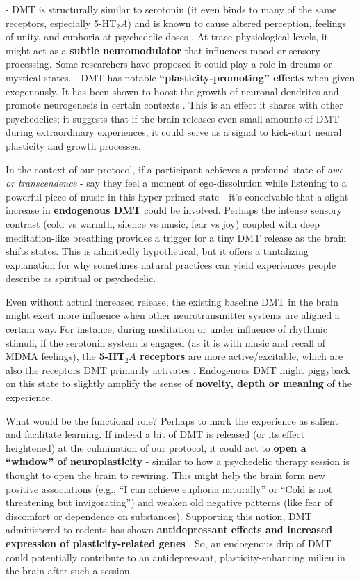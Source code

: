 \documentclass[11pt]{article}
\newcommand{\quotes}[1]{``#1''}
\begin{document}
- DMT is structurally similar to serotonin (it even binds to many of the same receptors, especially 5-HT$_2A$) and is known to cause altered perception, feelings of unity, and euphoria at psychedelic doses \cite{Dean2019}. At trace physiological levels, it might act as a \textbf{subtle neuromodulator} that influences mood or sensory processing. Some researchers have proposed it could play a role in dreams or mystical states.
- DMT has notable \textbf{\quotes{plasticity-promoting} effects} when given exogenously. It has been shown to boost the growth of neuronal dendrites and promote neurogenesis in certain contexts \cite{Dean2019}. This is an effect it shares with other psychedelics; it suggests that if the brain releases even small amounts of DMT during extraordinary experiences, it could serve as a signal to kick-start neural plasticity and growth processes.

In the context of our protocol, if a participant achieves a profound state of \textit{awe or transcendence} - say they feel a moment of ego-dissolution while listening to a powerful piece of music in this hyper-primed state - it's conceivable that a slight increase in \textbf{endogenous DMT} could be involved. Perhaps the intense sensory contrast (cold vs warmth, silence vs music, fear vs joy) coupled with deep meditation-like breathing provides a trigger for a tiny DMT release as the brain shifts states. This is admittedly hypothetical, but it offers a tantalizing explanation for why sometimes natural practices can yield experiences people describe as spiritual or psychedelic.

Even without actual increased release, the existing baseline DMT in the brain might exert more influence when other neurotransmitter systems are aligned a certain way. For instance, during meditation or under influence of rhythmic stimuli, if the serotonin system is engaged (as it is with music and recall of MDMA feelings), the \textbf{5-HT$_2A$ receptors} are more active/excitable, which are also the receptors DMT primarily activates \cite{Dean2019}. Endogenous DMT might piggyback on this state to slightly amplify the sense of \textbf{novelty, depth or meaning} of the experience.

What would be the functional role? Perhaps to mark the experience as salient and facilitate learning. If indeed a bit of DMT is released (or its effect heightened) at the culmination of our protocol, it could act to \textbf{open a \quotes{window} of neuroplasticity} - similar to how a psychedelic therapy session is thought to open the brain to rewiring. This might help the brain form new positive associations (e.g., \quotes{I can achieve euphoria naturally} or \quotes{Cold is not threatening but invigorating}) and weaken old negative patterns (like fear of discomfort or dependence on substances). Supporting this notion, DMT administered to rodents has shown \textbf{antidepressant effects and increased expression of plasticity-related genes} \cite{Dean2019}. So, an endogenous drip of DMT could potentially contribute to an antidepressant, plasticity-enhancing milieu in the brain after such a session.
\end{document}

